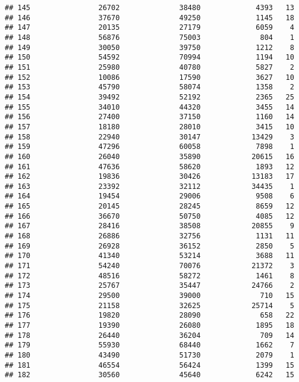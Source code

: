 \documentclass[
]{article}
\begin{document}
\begin{verbatim}
## 145                26702              38480             4393   13
## 146                37670              49250             1145   18
## 147                20135              27179             6059    4
## 148                56876              75003              804    1
## 149                30050              39750             1212    8
## 150                54592              70994             1194   10
## 151                25980              40780             5827    2
## 152                10086              17590             3627   10
## 153                45790              58074             1358    2
## 154                39492              52192             2365   25
## 155                34010              44320             3455   14
## 156                27400              37150             1160   14
## 157                18180              28010             3415   10
## 158                22940              30147            13429    3
## 159                47296              60058             7898    1
## 160                26040              35890            20615   16
## 161                47636              58620             1893   12
## 162                19836              30426            13183   17
## 163                23392              32112            34435    1
## 164                19454              29006             9508    6
## 165                20145              28245             8659   12
## 166                36670              50750             4085   12
## 167                28416              38508            20855    9
## 168                26886              32756             1131   11
## 169                26928              36152             2850    5
## 170                41340              53214             3688   11
## 171                54240              70076            21372    3
## 172                48516              58272             1461    8
## 173                25767              35447            24766    2
## 174                29500              39000              710   15
## 175                21158              32625            25714    5
## 176                19820              28090              658   22
## 177                19390              26080             1895   18
## 178                26440              36204              709   14
## 179                55930              68440             1662    7
## 180                43490              51730             2079    1
## 181                46554              56424             1399   15
## 182                30560              45640             6242   15

\end{verbatim}
\end{document}
